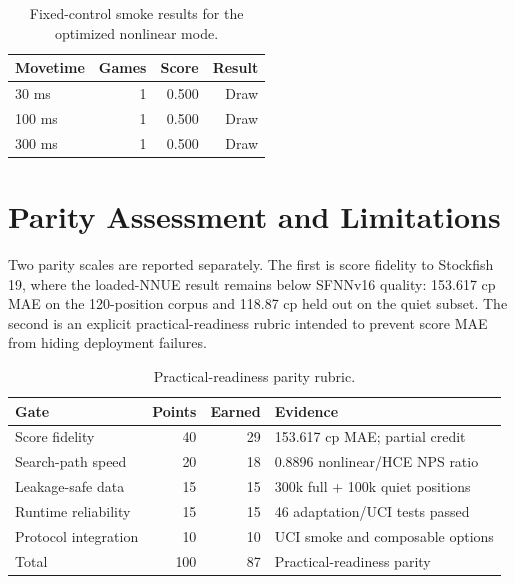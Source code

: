 \documentclass[conference]{IEEEtran}
\begin{document}
\begin{table}[t]
\centering
\caption{Fixed-control smoke results for the optimized nonlinear mode.}
\begin{tabular}{lrrr}
\toprule
Movetime & Games & Score & Result \\
\midrule
30 ms & 1 & 0.500 & Draw \\
100 ms & 1 & 0.500 & Draw \\
300 ms & 1 & 0.500 & Draw \\
\bottomrule
\end{tabular}
\end{table}

\section{Parity Assessment and Limitations}
Two parity scales are reported separately. The first is score fidelity to Stockfish 19, where the loaded-NNUE result remains below SFNNv16 quality: 153.617 cp MAE on the 120-position corpus and 118.87 cp held out on the quiet subset. The second is an explicit practical-readiness rubric intended to prevent score MAE from hiding deployment failures.

\begin{table}[t]
\centering
\caption{Practical-readiness parity rubric.}
\begin{tabular}{lrrl}
\toprule
Gate & Points & Earned & Evidence \\
\midrule
Score fidelity & 40 & 29 & 153.617 cp MAE; partial credit \\
Search-path speed & 20 & 18 & 0.8896 nonlinear/HCE NPS ratio \\
Leakage-safe data & 15 & 15 & 300k full + 100k quiet positions \\
Runtime reliability & 15 & 15 & 46 adaptation/UCI tests passed \\
Protocol integration & 10 & 10 & UCI smoke and composable options \\
\midrule
Total & 100 & 87 & Practical-readiness parity \\
\bottomrule
\end{tabular}
\end{table}
\end{document}

